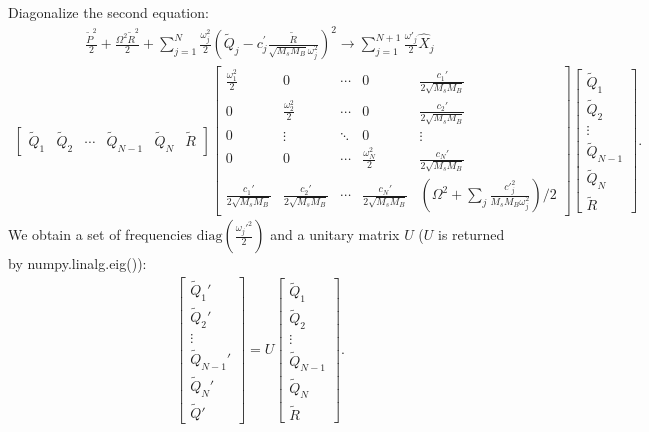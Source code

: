 \documentclass{article}
\begin{document}
Diagonalize the second equation:
\begin{align*}
		\frac{\tilde{P}^{2}}{2}
		+ \frac{\Omega^{2}\tilde{R}^2}{2}
		+ \sum_{j=1}^N \frac{\omega_{j}^{2}}{2} \left(\tilde{Q}_{j}-c^{\prime}_{j} \frac{\tilde{R}}{\sqrt{M_sM_B} \omega_{j}^{2}}\right)^{2} \to \sum_{j=1}^{N+1}\frac{\omega'_j}{2}  \hat{X}_j
\end{align*}
\begin{align*}
	\begin{bmatrix}
	\tilde{Q}_1 & \tilde{Q}_2 & \cdots & \tilde{Q}_{N-1} &  \tilde{Q}_N & \tilde{R}
\end{bmatrix}
	\begin{bmatrix}
		\frac{\omega_1^2}{2}        & 0                           & \cdots & 0                           & \frac{c_1'}{2\sqrt{M_sM_B}}                                    \\
		0                           & \frac{\omega_2^2}{2}        & \cdots & 0                           & \frac{c_2'}{2\sqrt{M_sM_B}}                                    \\
		0                           & \vdots                      & \ddots & 0                           & \vdots                                                         \\
		0                           & 0                           & \cdots & \frac{\omega_{N}^2}{2}      & \frac{c_N'}{2\sqrt{M_sM_B}}                                    \\
		\frac{c_1'}{2\sqrt{M_sM_B}} & \frac{c_2'}{2\sqrt{M_sM_B}} & \cdots & \frac{c_N'}{2\sqrt{M_sM_B}} & (\Omega^{2}+\sum_j \frac{ c'^ 2_{j}}{M_sM_B \omega_{j}^{2}})/2
	\end{bmatrix}
	\begin{bmatrix}
	\tilde{Q}_1\\
	\tilde{Q}_2\\
	\vdots \\
	\tilde{Q}_{N-1}\\
	\tilde{Q}_N\\
	\tilde{R}
\end{bmatrix}.
\end{align*}
We obtain a set of frequencies $\mathrm{diag}(\frac{\omega_{j}'^2}{2}) $ and a unitary matrix $U$ ($U$ is returned by \textsf{numpy.linalg.eig()}):
\begin{align*}
		\begin{bmatrix}
		\tilde{Q}_1'\\
		\tilde{Q}_2'\\
		\vdots \\
		\tilde{Q}_{N-1}'\\
		\tilde{Q}_N'\\
		\tilde{Q}'
	\end{bmatrix} = U
	\begin{bmatrix}
	\tilde{Q}_1\\
	\tilde{Q}_2\\
	\vdots \\
	\tilde{Q}_{N-1}\\
	\tilde{Q}_N\\
	\tilde{R}
\end{bmatrix}.
\end{align*}
\end{document}

